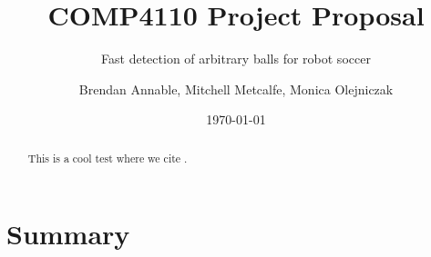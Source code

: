 \documentclass[11pt]{scrartcl} %
\title{COMP4110 Project Proposal}
\subtitle{Fast detection of arbitrary balls for robot soccer}
\author{ Brendan Annable, Mitchell Metcalfe, Monica Olejniczak }
\date{\today}
\begin{document}
	\maketitle

	\begin{abstract}
		
		This is a cool test where we cite \citep{Yuan2015}.
		
	\end{abstract}

	\newpage
	\tableofcontents
	\newpage


	\section{Summary} {

		
	}
\end{document}
